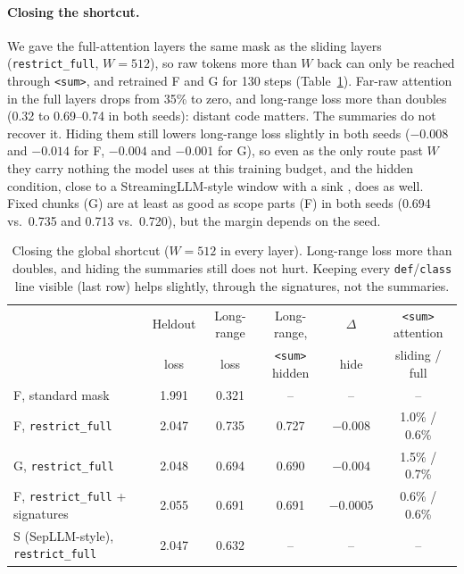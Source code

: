 \documentclass[11pt]{article}
\newcommand{\sumtok}{\texttt{<sum>}}
\begin{document}
\paragraph{Closing the shortcut.}
We gave the full-attention layers the same mask as the sliding layers
(\texttt{restrict\_full}, $W=512$), so raw tokens more than $W$ back can
only be reached through \sumtok{}, and retrained F and G for 130 steps
(Table~\ref{tab:rf}). Far-raw attention in the full layers drops from 35\%
to zero, and long-range loss more than doubles (0.32 to 0.69--0.74 in both
seeds): distant code matters. The summaries do not recover it. Hiding them
still lowers long-range loss slightly in both seeds ($-0.008$ and $-0.014$
for F, $-0.004$ and $-0.001$ for G), so even as the only route past $W$ they
carry nothing the model uses at this training budget, and the hidden
condition, close to a StreamingLLM-style window with a sink
\citep{xiao2023sinks}, does as well. Fixed chunks (G) are at least as good as
scope parts (F) in both seeds (0.694 vs.\ 0.735 and 0.713 vs.\ 0.720), but
the margin depends on the seed.

\begin{table}[t]
\centering\small
\begin{tabular}{@{}lccccc@{}}
\toprule
& Heldout & Long-range & Long-range, & $\Delta$ & \sumtok{} attention \\
& loss & loss & \sumtok{} hidden & hide & sliding / full \\
\midrule
F, standard mask & 1.991 & 0.321 & -- & -- & -- \\
F, \texttt{restrict\_full} & 2.047 & 0.735 & 0.727 & $-0.008$ & 1.0\% / 0.6\% \\
G, \texttt{restrict\_full} & 2.048 & 0.694 & 0.690 & $-0.004$ & 1.5\% / 0.7\% \\
F, \texttt{restrict\_full} + signatures & 2.055 & 0.691 & 0.691 & $-0.0005$ & 0.6\% / 0.6\% \\
S (SepLLM-style), \texttt{restrict\_full} & 2.047 & 0.632 & -- & -- & -- \\
\bottomrule
\end{tabular}
\caption{Closing the global shortcut ($W=512$ in every layer). Long-range loss
more than doubles, and hiding the summaries still does not hurt. Keeping every
\texttt{def}/\texttt{class} line visible (last row) helps slightly, through the
signatures, not the summaries.}
\label{tab:rf}
\end{table}
\end{document}
